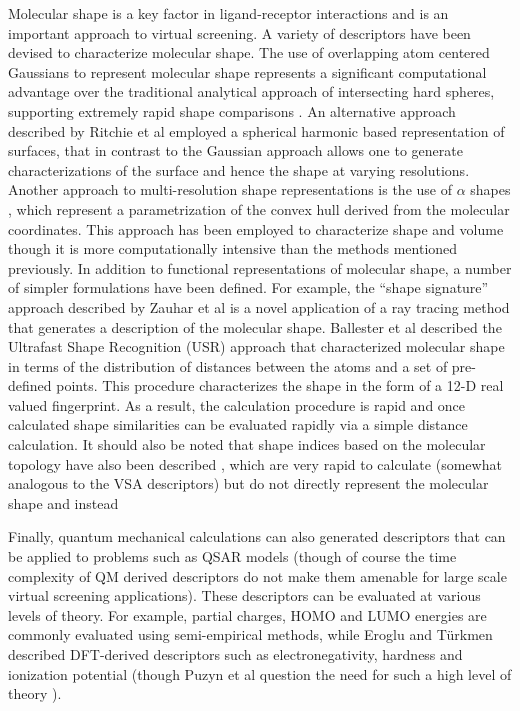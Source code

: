 \documentclass[letterpaper, 12pt]{article}
\begin{document}
Molecular shape is a key factor in ligand-receptor interactions and is
an important approach to virtual screening. A variety of descriptors
have been devised to characterize molecular shape. The use of
overlapping atom centered Gaussians to represent molecular shape
\cite{Grant:1995aa} represents a significant computational advantage
over the traditional analytical approach of intersecting hard spheres,
supporting extremely rapid shape comparisons \cite{Grant:1999vn}. An
alternative approach described by Ritchie et al \cite{Ritchie:1999kx}
employed a spherical harmonic based representation of surfaces, that
in contrast to the Gaussian approach allows one to generate
characterizations of the surface and hence the shape at varying
resolutions. Another approach to multi-resolution shape
representations is the use of $\alpha$ shapes
\cite{Edelsbrunner:1994aa}, which represent a parametrization of the
convex hull derived from the molecular coordinates. This approach has
been employed to characterize shape and volume \cite{Wilson:2009ys}
though it is more computationally intensive than the methods mentioned
previously. In addition to functional representations of molecular
shape, a number of simpler formulations have been defined. For
example, the ``shape signature'' approach described by Zauhar et al
\cite{Zauhar:2003fk} is a novel application of a ray tracing method
that generates a description of the molecular shape. Ballester et al
\cite{Ballester:2007aa} described the Ultrafast Shape Recognition
(USR) approach that characterized molecular shape in terms of the
distribution of distances between the atoms and a set of pre-defined
points. This procedure characterizes the shape in the form of a 12-D
real valued fingerprint. As a result, the calculation procedure is
rapid and once calculated shape similarities can be evaluated rapidly
via a simple distance calculation. It should also be noted that shape
indices based on the molecular topology have also been described
\cite{Kier:1985aa}, which are very rapid to calculate (somewhat
analogous to the VSA descriptors) but do not directly represent the
molecular shape and instead

Finally, quantum mechanical calculations can also generated
descriptors that can be applied to problems such as QSAR models
(though of course the time complexity of QM derived descriptors do not
make them amenable for large scale virtual screening
applications). These descriptors can be evaluated at various levels of
theory. For example, partial charges, HOMO and LUMO energies are
commonly evaluated using semi-empirical methods, while Eroglu and
T\"{u}rkmen \cite{Eroglu:2007uq} described DFT-derived descriptors
such as electronegativity, hardness and ionization potential (though
Puzyn et al question the need for such a high level of theory
\cite{Puzyn:2008fk}).
\end{document}
